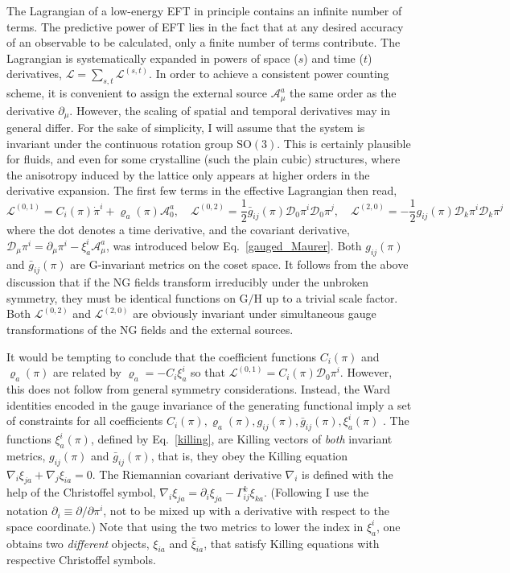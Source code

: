\documentclass[final,2p,times,12pt,sort&compress]{elsarticle}
\newcommand\gr[1]{\mathrm{#1}}              %
\newcommand\Lag{\mathscr{L}}                %
\newcommand\DD{\mathscr{D}}                 %
\newcommand\AAA{\mathscr{A}}                %
\newcommand\de{\partial}
\newcommand\vr{\varrho}
\newcommand\Pd[2]{\partial #1/\partial #2}  %
\begin{document}
The Lagrangian of a low-energy EFT in principle contains an infinite number of
terms. The predictive power of EFT lies in the fact that at any desired
accuracy of an observable to be calculated, only a finite number of terms
contribute. The Lagrangian is systematically expanded in powers of space ($s$)
and time ($t$) derivatives, $\Lag=\sum_{s,t}\Lag^{(s,t)}$. In order to achieve
a consistent power counting scheme, it is convenient to assign the external
source $\AAA^a_\mu$ the same order as the derivative $\de_\mu$. However, the
scaling of spatial and temporal derivatives may in general differ. For the sake
of simplicity, I will assume that the system is invariant under the continuous
rotation group $\gr{SO(3)}$. This is certainly plausible for fluids, and even
for some crystalline (such the plain cubic) structures, where the anisotropy
induced by the lattice only appears at higher orders in the derivative
expansion. The first few terms in the effective Lagrangian then read,
\begin{equation}
\Lag^{(0,1)}=C_i(\pi)\dot\pi^i+\vr_a(\pi)\AAA^a_0,\quad
\Lag^{(0,2)}=\frac12\bar g_{ij}(\pi)\DD_0\pi^i\DD_0\pi^j,\quad
\Lag^{(2,0)}=-\frac12g_{ij}(\pi)\DD_k\pi^i\DD_k\pi^j
\end{equation}
where the dot denotes a time derivative, and the covariant derivative,
$\DD_\mu\pi^i=\de_\mu\pi^i-\xi^i_a\AAA^a_\mu$, was introduced below
Eq.~\eqref{gauged_Maurer}. Both $g_{ij}(\pi)$ and $\bar
g_{ij}(\pi)$ are $\gr G$-invariant metrics on the coset space. It follows from
the above discussion that if the NG fields transform irreducibly under the
unbroken symmetry, they must be identical functions on $\gr{G/H}$ up to a
trivial scale factor. Both $\Lag^{(0,2)}$ and $\Lag^{(2,0)}$ are obviously
invariant under simultaneous gauge transformations of the NG fields and the
external sources.

It would be tempting to conclude that the coefficient functions $C_i(\pi)$ and
$\vr_a(\pi)$ are related by $\vr_a=-C_i\xi^i_a$ so that
$\Lag^{(0,1)}=C_i(\pi)\DD_0\pi^i$. However, this does not follow from general
symmetry considerations. Instead, the Ward identities encoded in the gauge
invariance of the generating functional imply a set of constraints for all
coefficients $C_i(\pi),\vr_a(\pi),g_{ij}(\pi),\bar g_{ij}(\pi),\xi^i_a(\pi)$
\cite{Leutwyler:1993gf}. The functions $\xi^i_a(\pi)$, defined by
Eq.~\eqref{killing}, are Killing vectors of \emph{both} invariant metrics,
$g_{ij}(\pi)$ and $\bar g_{ij}(\pi)$, that is, they obey the Killing
equation $\nabla_i\xi_{ja}+\nabla_j\xi_{ia}=0$. The Riemannian covariant
derivative $\nabla_i$ is defined with the help of the Christoffel symbol,
$\nabla_i\xi_{ja}=\de_i\xi_{ja}-\Gamma^k_{ij}\xi_{ka}$. (Following
\cite{Leutwyler:1993gf} I use the notation $\de_i\equiv\Pd{}{\pi^i}$, not to be
mixed up with a derivative with respect to the space coordinate.) Note
that using the two metrics to lower the index in $\xi^i_a$, one obtains two
\emph{different} objects, $\xi_{ia}$ and $\bar\xi_{ia}$, that satisfy Killing
equations with respective Christoffel symbols.
\end{document}
